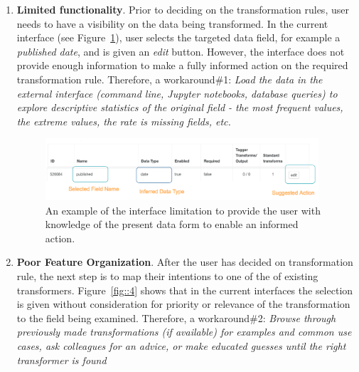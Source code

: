\documentclass[12pt,letterpaper]{article}
\begin{document}
\begin{enumerate}
    \item \textbf{Limited functionality}. Prior to deciding on the transformation rules, user needs to have a visibility on the data being transformed. In the current interface (see Figure~\ref{fig::3}), user selects the targeted data field, for example a \textit{published date}, and is given an \textit{edit} button. However, the interface does not provide enough information to make a fully informed action on the required transformation rule. Therefore, a workaround\#1:  
    \textit{Load the data in the external interface (command line, Jupyter notebooks, database queries) to explore descriptive statistics of the original field - the most frequent values,  the extreme values, the rate is missing fields, etc.}
    
    \begin{figure}[h]
    \centering
    \includegraphics[width=4in, scale=.4]{DataVisibility.png}
    \caption{An example of the interface limitation to provide the user with knowledge of the present data form to enable an informed action.}
    \label{fig::3}
    \end{figure}
    
    
    \item \textbf{Poor Feature Organization}. After the user has decided on transformation rule, the next step is to map their intentions to one of the of existing transformers. Figure~\ref{fig::4} shows that in the current interfaces the selection is given without consideration for priority or relevance of the transformation to the field being examined. Therefore, a workaround\#2:
    \textit{Browse through previously made transformations (if available) for examples and common use cases, ask colleagues for an advice, or make educated guesses until the right transformer is found}
    

\end{enumerate}
\end{document}
